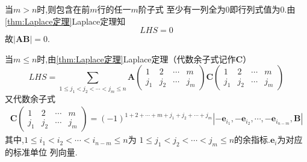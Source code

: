 \begin{formal}
\begin{Proof}
当$m>n$时,则包含在前$m$行的任一$m$阶子式
至少有一列全为0即行列式值为0.由\cref{thm:Laplace定理}Laplace定理知
\[
LHS = 0
\]
故$\left|\bm{AB}\right|=0$.

当$m\leqslant n$时,由\cref{thm:Laplace定理}Laplace定理（代数余子式记作$\bm{C}$）
\[
LHS =\sum_{1\leqslant j_1<j_2<\cdots<j_m\leqslant n}\bm{A}\begin{pmatrix}
    1&2&\cdots&m\\
    j_1&j_2&\cdots&j_m
\end{pmatrix}\bm{C}\begin{pmatrix}
    1&2&\cdots&m\\
    j_1&j_2&\cdots&j_m
\end{pmatrix}
\]
又代数余子式
\begin{align*}
    \bm{C}\begin{pmatrix}
    1&2&\cdots&m\\
    j_1&j_2&\cdots&j_m
\end{pmatrix}=\left(-1
\right)^{1+2+\cdots+m+j_1
+j_2+\cdots+j_m}\left|-\bm{e}_{i_1},-\bm{e}_{i_2},\cdots,-\bm{e}_{i_{n-m}},\bm{B}\right|
\end{align*}
其中,$1\leqslant i_1
<i_2<\cdots<i_{n-m}
\leqslant n$为
$1\leqslant j_1
<j_2<\cdots<j_m
\leqslant n$的余指标.$
\bm{e}_i$为对应的标准单位
列向量.


\end{Proof}
\end{formal}
